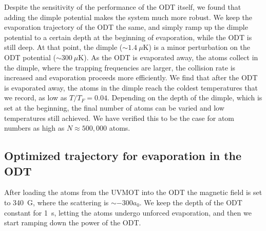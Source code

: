 Despite the sensitivity of the performance of the ODT itself, we found that
adding the dimple potential makes the system much more robust.   We keep the
evaporation trajectory of the ODT the same, and simply ramp up the dimple
potential to a certain depth at the beginning of evaporation, while the ODT is
still deep.  At that point, the dimple ($\sim1.4~\mu$K) is a minor perturbation
on the ODT potential ($\sim300~\mu$K). As the ODT is evaporated away,  the
atoms collect in the dimple, where the trapping frequencies are larger, the
collision rate is increased and evaporation proceeds more efficiently.  We find
that after the ODT is evaporated away, the atoms in the dimple reach the
coldest temperatures that we record,  as low as $T/T_{F}=0.04$.   Depending on
the depth of the dimple, which is set at the beginning, the final number of
atoms can be varied and low temperatures still achieved.  We have verified this
to be the case for atom numbers as high as $N\approx 500,000$ atoms.

\subsection{Optimized trajectory for evaporation in the ODT} 

After loading the atoms from the UVMOT into the ODT the magnetic field is set
to 340~G, where the scattering is $\sim-300a_{0}$.   We keep the depth of the
ODT constant for 1~s, letting the atoms undergo unforced evaporation, and then
we start ramping down the power of the ODT. 

